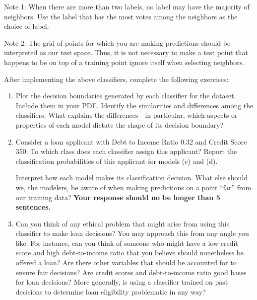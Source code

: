 \documentclass[submit]{../harvardml}
\begin{document}
\begin{problem}
\begin{enumerate}[label=\alph*)]
        Note 1: When there are more than two labels, no label may have the
        majority of neighbors.  Use the label that has the most votes among
        the neighbors as the choice of label.

        Note 2: The grid of points for which you are making predictions
        should be interpreted as our test space.  Thus, it is not necessary
        to make a test point that happens to be on top of a training point
        ignore itself when selecting neighbors.

\end{enumerate}

After implementing the above classifiers, complete the following exercises:
  \begin{enumerate}



      \item Plot the decision boundaries generated by each classifier for the dataset. Include them in your PDF.
            Identify the similarities and differences among the classifiers. What explains the differences---in particular, which aspects or properties of each model dictate the shape of its decision boundary?
    
      \item
    
            Consider a loan applicant with Debt to Income Ratio 0.32 and Credit Score 350. To which class does each classifier assign this applicant? Report the classification probabilities of this applicant for models (c) and (d).
            
            Interpret how each model makes its classification decision. What else should we, the modelers, be aware of when making predictions on a point “far” from our training data? \textbf{Your response should no be longer than 5 sentences.}

    \item
        Can you think of any ethical problem that might arise from using this classifier to make loan decisions? You may approach this from any angle you like. For instance, can you think of someone who might have a low credit score and high debt-to-income ratio that you believe should nonetheless be offered a loan? Are there other variables that should be accounted for to ensure fair decisions? Are credit scores and debt-to-income ratio good bases for loan decisions? More generally, is using a classifier trained on past decisions to determine loan eligibility problematic in any way?
    \end{enumerate}
\end{problem}
\end{document}
